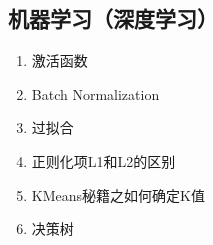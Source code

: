 \documentclass[letterpaper,10pt,english]{sphinxmanual}
\begin{document}
\subsection{机器学习（深度学习）}
\label{\detokenize{else/01_interview:id4}}\begin{enumerate}
\item {} 
激活函数

\end{enumerate}
\begin{quote}

\end{quote}
\begin{enumerate}
\setcounter{enumi}{1}
\item {} 
Batch Normalization

\end{enumerate}
\begin{quote}

\end{quote}
\begin{enumerate}
\setcounter{enumi}{2}
\item {} 
过拟合

\end{enumerate}
\begin{quote}

\end{quote}
\begin{enumerate}
\setcounter{enumi}{3}
\item {} 
正则化项L1和L2的区别

\end{enumerate}
\begin{quote}

\end{quote}
\begin{enumerate}
\setcounter{enumi}{4}
\item {} 
KMeans秘籍之如何确定K值

\end{enumerate}
\begin{quote}

\end{quote}
\begin{enumerate}
\setcounter{enumi}{5}
\item {} 
决策树

\end{enumerate}
\end{document}
